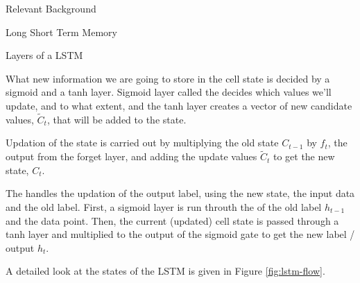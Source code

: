 \documentclass{article}
\begin{document}
\begin{psection}{Relevant Background}
\begin{psubsection}{Long Short Term Memory}
\begin{pssubsection}{Layers of a LSTM}
\begin{enumerate}[label=\bt{\theenumi.}]
					What new information we are going to store in the cell state is decided by a sigmoid and a tanh layer.
					Sigmoid layer called the  decides which values we'll update, and to what extent, and the tanh layer creates a vector of new candidate values, $\widetilde{C}_t$, that will be added to the state.

					Updation of the state is carried out by multiplying the old state $C_{t - 1}$ by $f_t$, the output from the forget layer, and adding the update values $\widetilde{C}_t$ to get the new state, \ie $C_t$.

					The  handles the updation of the output label, using the new state, the input data and the old label.
					First, a sigmoid layer is run throuth the  of the old label $h_{t - 1}$ and the data point.
					Then, the current (updated) cell state is passed through a tanh layer and multiplied to the output of the sigmoid gate to get the new label / output $h_t$.
			\end{enumerate}

			A detailed look at the states of the LSTM is given in Figure \ref{fig:lstm-flow}.
		\end{pssubsection}


\end{psubsection}
\end{psection}
\end{document}
